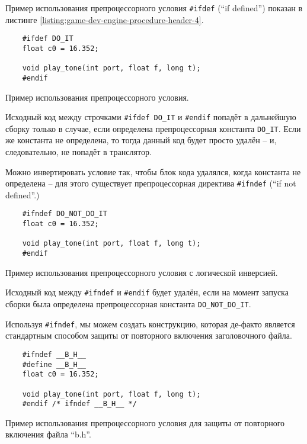 \documentclass[../sparc.tex]{subfiles}
\begin{document}
Пример использования препроцессорного условия \texttt{#ifdef} (``if
defined'') показан в листинге \ref{listing:game-dev-engine-procedure-header-4}.

\begin{listing}[H]
  \begin{verbatim}
    #ifdef DO_IT
    float c0 = 16.352;

    void play_tone(int port, float f, long t);
    #endif
  \end{verbatim}
  \label{listing:game-dev-engine-procedure-header-4}
  \caption{Пример использования препроцессорного условия.}
\end{listing}

Исходный код между строчками \texttt{#ifdef DO_IT} и
\texttt{#endif} попадёт в дальнейшую сборку только в случае, если
определена препроцессорная константа \texttt{DO_IT}.  Если же константа
не определена, то тогда данный код будет просто удалён -- и, следовательно, не
попадёт в транслятор.

Можно инвертировать условие так, чтобы блок кода удалялся, когда константа не
определена -- для этого существует препроцессорная директива
\texttt{#ifndef} (``if not defined''.)

\begin{listing}[H]
  \begin{verbatim}
    #ifndef DO_NOT_DO_IT
    float c0 = 16.352;

    void play_tone(int port, float f, long t);
    #endif
  \end{verbatim}
  \label{listing:game-dev-engine-procedure-header-5}
  \caption{Пример использования препроцессорного условия с логической
    инверсией.}
\end{listing}

Исходный код между \texttt{#ifndef} и \texttt{#endif} будет
удалён, если на момент запуска сборки была определена препроцессорная константа
\texttt{DO_NOT_DO_IT}.

Используя \texttt{#ifndef}, мы можем создать конструкцию, которая
де-факто является стандартным способом защиты от повторного включения
заголовочного файла.

\begin{listing}[H]
  \begin{verbatim}
    #ifndef __B_H__
    #define __B_H__
    float c0 = 16.352;

    void play_tone(int port, float f, long t);
    #endif /* ifndef __B_H__ */
  \end{verbatim}
  \label{listing:game-dev-engine-procedure-header-6}
  \caption{Пример использования препроцессорного условия для защиты от
    повторного включения файла ``b.h''.}
\end{listing}
\end{document}
